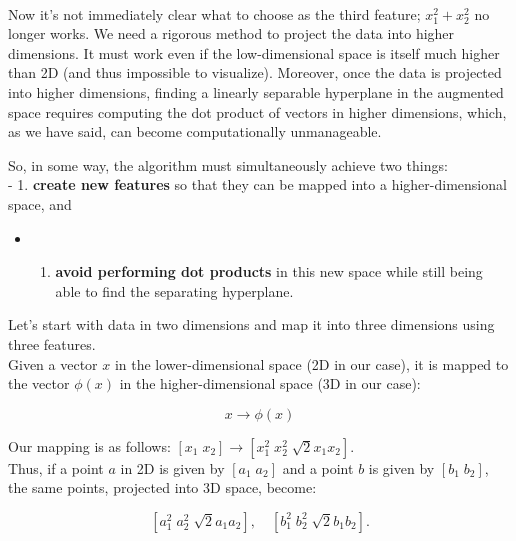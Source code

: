 \documentclass[11pt]{article}
\providecommand{\tightlist}{%
      \setlength{\itemsep}{0pt}\setlength{\parskip}{0pt}}
\begin{document}
    \begin{center}
    \end{center}
    { \hspace*{\fill} \\}
    
    Now it's not immediately clear what to choose as the third feature;
$x_1^2 + x_2^2$ no longer works. We need a rigorous method to project
the data into higher dimensions. It must work even if the
low-dimensional space is itself much higher than 2D (and thus impossible
to visualize). Moreover, once the data is projected into higher
dimensions, finding a linearly separable hyperplane in the augmented
space requires computing the dot product of vectors in higher
dimensions, which, as we have said, can become computationally
unmanageable.

So, in some way, the algorithm must simultaneously achieve two things:\\
- 1. \textbf{create new features} so that they can be mapped into a
higher-dimensional space, and

\begin{itemize}
\tightlist
\item
  \begin{enumerate}
  \def\labelenumi{\arabic{enumi}.}
  \setcounter{enumi}{1}
  \tightlist
  \item
    \textbf{avoid performing dot products} in this new space while still
    being able to find the separating hyperplane.
  \end{enumerate}
\end{itemize}

Let's start with data in two dimensions and map it into three dimensions
using three features.\\
Given a vector $x$ in the lower-dimensional space (2D in our case), it
is mapped to the vector $\phi(x)$ in the higher-dimensional space (3D
in our case):

$$
x \to \phi(x)
$$

Our mapping is as follows:
$[x_1 \; x_2] \to [x_1^2 \; x_2^2 \; \sqrt{2}x_1x_2]$.\\
Thus, if a point $a$ in 2D is given by $[a_1 \; a_2]$ and a point
$b$ is given by $[b_1 \; b_2]$, the same points, projected into 3D
space, become:

$$
[a_1^2 \; a_2^2 \; \sqrt{2}a_1a_2], \quad [b_1^2 \; b_2^2 \; \sqrt{2}b_1b_2].
$$
\end{document}
